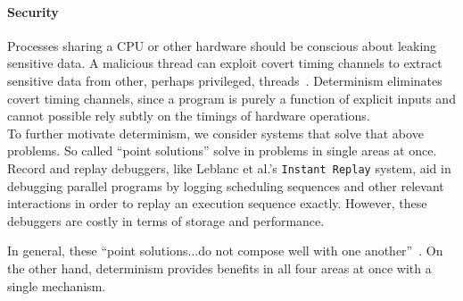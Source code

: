 \paragraph{Security} Processes sharing a CPU or other hardware should be
conscious about leaking sensitive data. A malicious thread can exploit covert
timing channels to extract sensitive data from other, perhaps privileged,
threads~\cite{Aviram10cloud}. Determinism eliminates covert timing channels,
since a program is purely a function of explicit inputs and cannot possible rely
subtly on the timings of hardware operations.
\\

To further motivate determinism, we consider systems that solve that above
problems. So called ``point solutions'' solve in problems in single areas at
once. Record and replay debuggers, like Leblanc et al.'s {\tt Instant Replay}
system, aid in debugging parallel programs by logging scheduling sequences and
other relevant interactions in order to replay an execution sequence exactly.
However, these debuggers are costly in terms of storage and performance.
\iffalse Even with replay ability, the execution sequence is still arbitrary and
gives the programmer no intuition about the program's behavior. \fi
In general, these ``point solutions...do not compose well with one
another''~\cite{Bergan11}. On the other hand, determinism provides benefits in
all four areas at once with a single mechanism.

\iffalse
\begin{itemize}
	\item Deterministic execution benefits, four main areas
	\begin{itemize}
		\item Debugging becomes easier, since bugs are always reproducible. Benefits
			enhanced by Determinator’s predictability.
		\item Testing: one-to-one mapping for inputs to outputs. Again, predictability
			and modularity can simplify designing tests.
		\item Fault tolerance
		\item Security: covert channels
	\end{itemize}
	\item ``Point solutions'' in particular areas are unrelated to each other and do
		not compose well. (Find point solutions to go into relevant work.)
	\item Determinism is solution offering benefits in all areas at once.
	\item Determinator’s design also provides predictability. Programmers can
		reason about code without having to make assumptions: nothing is arbitrary.
		``Program logic alone'' determines how a program proceeds.
	\item Linux is widely used, deployed on millions of machines. Potential for
		uptake is very high if we can make the implementation reasonably easy to
		patch.
	\item Aviram compared Determinator to Linux, but we can compare deterministic
		Linux to nondeterministic Linux for nearly optimal evaluation of this design.
\end{itemize}
\fi


